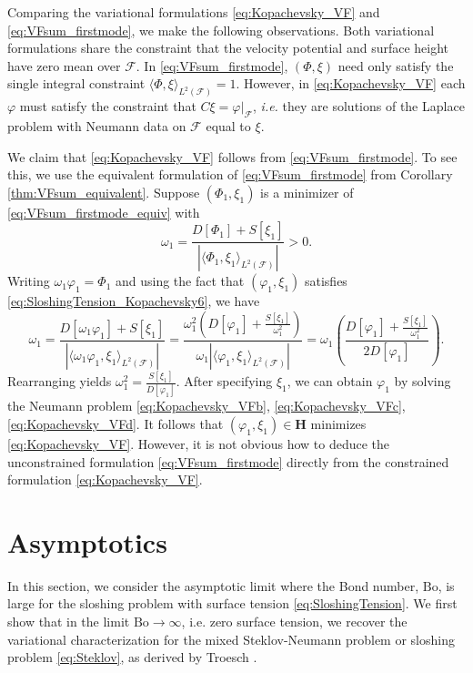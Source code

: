 \documentclass[letterpaper, 12pt]{amsart}
\newcommand{\bond}{\mathrm{Bo}}
\renewcommand{\H}{\mathbf{H}}
\newcommand{\F}{\mathcal{F}}
\begin{document}
Comparing the variational formulations \eqref{eq:Kopachevsky_VF} and \eqref{eq:VFsum_firstmode}, we make the following observations.  Both variational formulations share the  constraint that the velocity potential and surface height  have zero mean over $\F$. In  \eqref{eq:VFsum_firstmode}, $(\Phi,\xi)$ need only satisfy the single integral constraint $\langle\Phi,\xi\rangle_{L^2(\F)} = 1$. However, in \eqref{eq:Kopachevsky_VF} each $\varphi$ must satisfy the constraint that $C\xi=\varphi|_{\F}$, {\it{i.e.}} they are solutions of the Laplace problem with Neumann data on $\F$ equal to $\xi$.

We claim that \eqref{eq:Kopachevsky_VF} follows  from  \eqref{eq:VFsum_firstmode}. To see this, we use the equivalent formulation of \eqref{eq:VFsum_firstmode} from Corollary \ref{thm:VFsum_equivalent}. Suppose $(\Phi_1,\xi_1)$ is a minimizer of \eqref{eq:VFsum_firstmode_equiv} with
\[ \omega_1 = \frac{D[\Phi_1] + S[\xi_1]}{|\langle\Phi_1,\xi_1\rangle_{L^2(\F)}|}>0. \]
Writing $\omega_1\varphi_1=\Phi_1$ and using the fact that $(\varphi_1,\xi_1)$ satisfies \eqref{eq:SloshingTension_Kopachevsky6}, we have
\[ \omega_1 = \frac{D[\omega_1\varphi_1] + S[\xi_1]}{|\langle\omega_1\varphi_1,\xi_1\rangle_{L^2(\F)}|} = \frac{\omega_1^2\left(D[\varphi_1] + \frac{S[\xi_1]}{\omega_1^2}\right)}{\omega_1|\langle\varphi_1,\xi_1\rangle_{L^2(\F)}|} = \omega_1\left(\frac{D[\varphi_1] + \frac{S[\xi_1]}{\omega_1^2}}{2D[\varphi_1]}\right). \]
Rearranging yields
$ \omega_1^2 = \frac{S[\xi_1]}{D[\varphi_1]}$. After specifying $\xi_1$,  we can obtain  $\varphi_1$ by solving 
the Neumann problem \eqref{eq:Kopachevsky_VFb}, \eqref{eq:Kopachevsky_VFc}, \eqref{eq:Kopachevsky_VFd}. 
It follows that  $(\varphi_1,\xi_1)\in\H$ minimizes \eqref{eq:Kopachevsky_VF}. 
However, it is not obvious how to  deduce the unconstrained formulation  \eqref{eq:VFsum_firstmode} directly from the constrained formulation \eqref{eq:Kopachevsky_VF}. 






\section{Asymptotics} \label{sec:Large Bond Number Asymptotics} In this section, we consider the asymptotic limit where the Bond number,  $\bond$, is large for the sloshing problem with surface tension \eqref{eq:SloshingTension}. We first show that in the limit $\bond\to\infty$, i.e. zero surface tension, we recover the variational characterization for the mixed Steklov-Neumann problem or sloshing problem \eqref{eq:Steklov}, as derived by Troesch \cite{Troesch:1965aa}.
\end{document}
